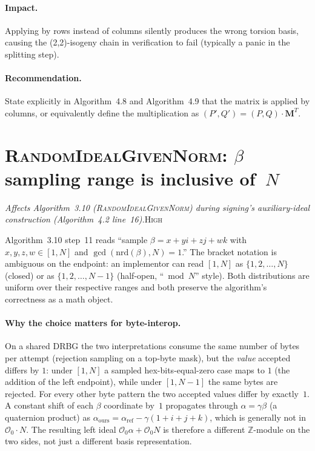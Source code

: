 \documentclass[a4paper,11pt]{article}
\newcommand{\algo}[1]{Algorithm~#1}
\newcommand{\high}{\textsc{\color{BurntOrange}High}}
\newcommand{\finding}[2]{\noindent\textit{#1}\hfill#2\par\smallskip}
\begin{document}
\paragraph{Impact.}
Applying by rows instead of columns silently produces the wrong
torsion basis, causing the (2,2)-isogeny chain in verification to
fail (typically a panic in the splitting step).

\paragraph{Recommendation.}
State explicitly in \algo{4.8} and \algo{4.9} that the matrix is
applied by columns, or equivalently define the multiplication as
$(P', Q') = (P, Q) \cdot \mathbf{M}^T$.

\section{\textsc{RandomIdealGivenNorm}: $\beta$ sampling range is
  inclusive of~$N$}
\label{sec:random-ideal-beta-range}

\finding{Affects \algo{3.10} (\textsc{RandomIdealGivenNorm})
during signing's auxiliary-ideal construction
(\algo{4.2} line~16).}{\high}

\algo{3.10} step~11 reads
``sample $\beta = x + yi + zj + wk$ with $x, y, z, w \in [1, N]$
and $\gcd(\mathrm{nrd}(\beta), N) = 1$.''  The bracket notation
is ambiguous on the endpoint: an implementor can read
$[1, N]$ as $\{1, 2, \ldots, N\}$ (closed) or as $\{1, 2,
\ldots, N{-}1\}$ (half-open, ``$\bmod N$'' style).  Both
distributions are uniform over their respective ranges and both
preserve the algorithm's correctness as a math object.

\paragraph{Why the choice matters for byte-interop.}
On a shared DRBG the two interpretations consume the same
number of bytes per attempt (rejection sampling on a top-byte
mask), but the \emph{value} accepted differs by $1$: under
$[1, N]$ a sampled hex-bits-equal-zero case maps to $1$ (the
addition of the left endpoint), while under $[1, N{-}1]$ the
same bytes are rejected.  For every other byte pattern the two
accepted values differ by exactly~$1$.  A constant shift of
each $\beta$ coordinate by~$1$ propagates through
$\alpha = \gamma\beta$ (a quaternion product) as
$\alpha_\mathrm{ours} = \alpha_\mathrm{ref} - \gamma(1 + i + j + k)$,
which is generally not in $\mathcal{O}_0 \cdot N$.  The
resulting left ideal $\mathcal{O}_0\alpha + \mathcal{O}_0 N$
is therefore a different $\mathbb{Z}$-module on the two sides,
not just a different basis representation.
\end{document}
